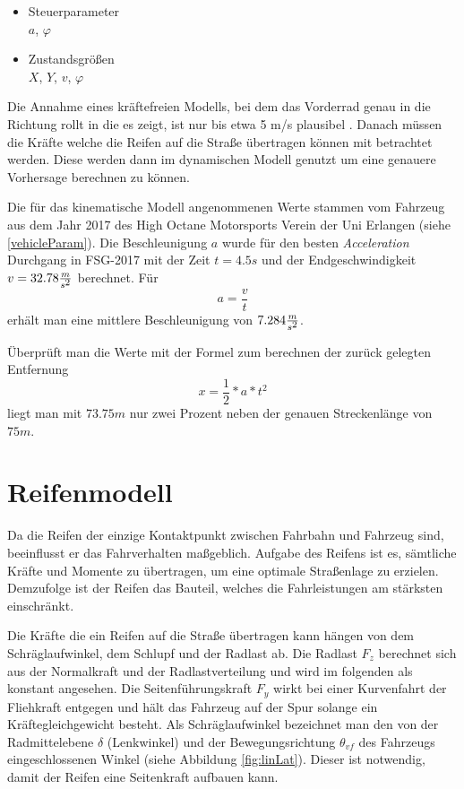 \documentclass{like}
\begin{document}
\begin{itemize}
	\item Steuerparameter  \\
			\(a\), \(\varphi\)
	\item Zustandsgrößen \\
			\(X\), \(Y\), \(v\), \(\varphi\)
	
\end{itemize}


Die Annahme eines kräftefreien Modells, bei dem das Vorderrad genau in die Richtung rollt in die es zeigt, ist nur bis etwa 5 m/s plausibel \cite{rajamani2011vehicle}. Danach müssen die Kräfte welche die Reifen auf die Straße übertragen können mit betrachtet werden. Diese werden dann im dynamischen Modell genutzt um eine genauere Vorhersage berechnen zu können.

Die für das kinematische Modell angenommenen Werte stammen vom Fahrzeug aus dem Jahr 2017 des High Octane Motorsports Verein der Uni Erlangen (siehe \ref{vehicleParam}). Die Beschleunigung \(a\) wurde für den besten \textit{Acceleration} Durchgang in FSG-2017 mit der Zeit $t = 4.5s$ und der Endgeschwindigkeit $v = 32.78 \frac{m}{s\textsuperscript{2}}$ berechnet. Für 
\begin{equation}
	a = \frac{v}{t} 
\end{equation}
erhält man eine mittlere Beschleunigung von $7.284 \frac{m}{s\textsuperscript{2}} $.

Überprüft man die Werte mit der Formel zum berechnen der zurück gelegten Entfernung 
\begin{equation}
x = \frac{1}{2} * a * t^2  
\end{equation}
liegt man mit \(73.75m\) nur zwei Prozent neben der genauen Streckenlänge von \(75m\).


\section{Reifenmodell}
\label{tireModel}
Da die Reifen der einzige Kontaktpunkt zwischen Fahrbahn und Fahrzeug sind,  beeinflusst er das Fahrverhalten maßgeblich. Aufgabe des Reifens ist es, sämtliche Kräfte und Momente zu übertragen, um eine optimale Straßenlage zu erzielen. Demzufolge ist der Reifen das Bauteil, welches die Fahrleistungen am stärksten einschränkt.

Die Kräfte die ein Reifen auf die Straße übertragen kann hängen von dem Schräglaufwinkel, dem Schlupf und der Radlast ab. Die Radlast \(F_z\) berechnet sich aus der Normalkraft und der Radlastverteilung und wird im folgenden als konstant angesehen.
Die Seitenführungskraft \(F_y\) wirkt bei einer Kurvenfahrt der Fliehkraft entgegen und hält das Fahrzeug auf der Spur solange ein Kräftegleichgewicht besteht. Als Schräglaufwinkel bezeichnet man den von der Radmittelebene \(\delta\) (Lenkwinkel) und der Bewegungsrichtung \(\theta_{vf}\) des Fahrzeugs eingeschlossenen Winkel (siehe Abbildung \ref{fig:linLat}). Dieser ist notwendig, damit der Reifen eine Seitenkraft aufbauen kann. \\
\end{document}
